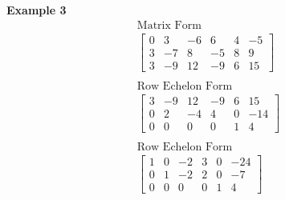 \documentclass{article}
\begin{document}
  \textbf{Example 3}
  \[
    \begin{gathered}
      \text{Matrix Form}\\ 
    \begin{bmatrix}
      0 &3 &-6 &6 &4 &-5\\
      3 &-7 &8 &-5 &8 &9\\
      3 &-9 &12 &-9 &6 &15
    \end{bmatrix}\\
    ~\\
    \text{Row Echelon Form}\\
    \begin{bmatrix}
      3 &-9 &12 &-9 &6 &15\\
      0 &2 &-4 &4 &0 &-14\\
      0 &0 &0 &0 &1 &4
    \end{bmatrix}\\
    ~\\
    \text{Row Echelon Form}\\
    \begin{bmatrix}
      1 &0 &-2 &3 &0 &-24\\
      0 &1 &-2 &2 &0 &-7\\
      0 &0 &0 &0 &1 &4
    \end{bmatrix}
    \end{gathered}
  \]
\end{document}
